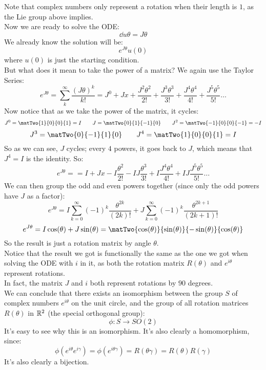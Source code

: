 \documentclass[12pt]{article}
\begin{document}
Note that complex numbers only represent a
rotation when their length is $1$,
as the Lie group above implies. \\

Now we are ready to solve the ODE:
\[ \dd{u}{\theta} = J\theta \]
We already know the solution will be:
\[ e^{J\theta}u(0) \]
where $u(0)$ is just the starting condition. \\
But what does it mean to take the power of a
matrix? 
We again use the Taylor Series:
\[ e^{J\theta} = \sum_{k}^{\infty} 
\dfrac{(J\theta)^k}{k!} 
= J^0 + Jx + \dfrac{J^2\theta^2}{2!}
+ \dfrac{J^3\theta^3}{3!} + \dfrac{J^4\theta^4}{4!}
+ \dfrac{J^5\theta^5}{5!} \dots \]
Now notice that as we take the power of the
matrix, it cycles:
\[ J^0 = \matTwo{1}{0}{0}{1} = I \qquad
J = \matTwo{0}{1}{-1}{0}
\qquad J^2 = \matTwo{-1}{0}{0}{-1} = -I \]
\[ J^3 = \matTwo{0}{-1}{1}{0}
\qquad J^4 = \matTwo{1}{0}{0}{1} = I \]
So as we can see, $J$ cycles;
every $4$ powers, it goes back to $J$,
which means that $J^4 = I$ is the identity.
So:
\[ e^{J\theta} =
= I + Jx -I\dfrac{\theta^2}{2!}
- IJ\dfrac{\theta^3}{3!} + I\dfrac{J^4\theta^4}{4!}
+ IJ\dfrac{J^5\theta^5}{5!} \dots \]
We can then group the odd and even powers
together (since only the odd powers have $J$
as a factor):
\[ e^{J\theta}
= I\sum_{k = 0}^{\infty} 
(-1)^{k} \dfrac{\theta^{2k}}{(2k)!}
+ J\sum_{k = 0}^{\infty} (-1)^{k}
\dfrac{\theta^{2k + 1}}{(2k + 1)!} \]
\[ e^{J\theta} = I\cos(\theta) + J\sin(\theta)
= \matTwo{\cos(\theta)}{\sin(\theta)}
{-\sin(\theta)}{\cos(\theta)} \]
So the result is just a rotation matrix
by angle $\theta$. \\

Notice that the result we got is functionally
the same as the one we got when solving the
ODE with $i$ in it,
as both the rotation matrix $R(\theta)$
and $e^{i\theta}$ represent rotations. \\
In fact, the matrix $J$ and $i$
both represent rotations by $90$ degrees. \\

We can conclude that there exists
an isomorphism between the group $S$
of complex numbers $e^{i\theta}$
on the unit circle, and the group of
all rotation matrices $R(\theta)$
in $\mathbb{R}^2$ (the special orthogonal group):
\[ \phi: S \to SO(2) \]
It's easy to see why this is an isomorphism.
It's also clearly a homomorphism,
since:
\[ \phi(e^{i\theta}e^{i\gamma})
= \phi(e^{i\theta \gamma})
= R(\theta \gamma) = R(\theta)R(\gamma) \]
It's also clearly a bijection. \\
\end{document}
